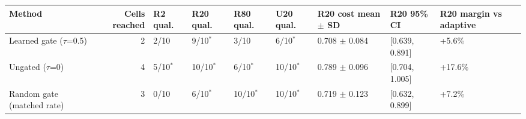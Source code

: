 \begin{tabular}{lrlllllll}
\hline
Method & Cells reached & R2 qual. & R20 qual. & R80 qual. & U20 qual. & R20 cost mean $\pm$ SD & R20 95\% CI & R20 margin vs adaptive \\
\hline
Learned gate ($\tau$=0.5) & 2 & 2/10 & 9/10$^\ast$ & 3/10 & 6/10$^\ast$ & 0.708 $\pm$ 0.084 & [0.639, 0.891] & +5.6\% \\
Ungated ($\tau$=0) & 4 & 5/10$^\ast$ & 10/10$^\ast$ & 6/10$^\ast$ & 10/10$^\ast$ & 0.789 $\pm$ 0.096 & [0.704, 1.005] & +17.6\% \\
Random gate (matched rate) & 3 & 0/10 & 6/10$^\ast$ & 10/10$^\ast$ & 10/10$^\ast$ & 0.719 $\pm$ 0.123 & [0.632, 0.899] & +7.2\% \\
\hline
\end{tabular}
